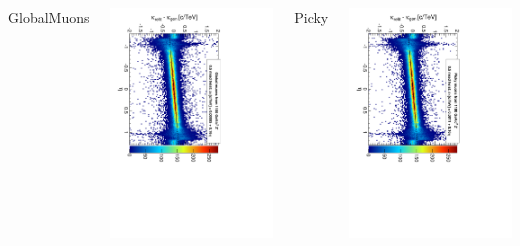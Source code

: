 \documentclass[compress]{beamer}
\begin{document}
\begin{frame}
\vspace{-0.25 cm}
\begin{columns}
\begin{center}
GlobalMuons

\vspace{-0.2 cm}
\end{center}
\includegraphics[height=\linewidth, angle=90]{curvbias_vseta_twist0_5mrad_1100_GlobalMuons2.pdf}

\begin{center}
Picky

\vspace{-0.2 cm}
\end{center}
\includegraphics[height=\linewidth, angle=90]{curvbias_vseta_twist0_5mrad_1100_TeVMuons2picky.pdf}


\end{columns}
\end{frame}
\end{document}
